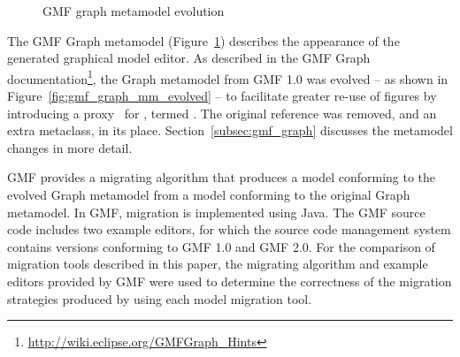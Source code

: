 \begin{figure}[htbp]
	\centering
	\caption{GMF graph metamodel evolution}
\label{fig:gmf_graph_mms}
\end{figure}

The GMF Graph metamodel (Figure~\ref{fig:gmf_graph_mms}) describes the appearance of the generated graphical model editor. As described in the GMF Graph documentation\footnote{\url{http://wiki.eclipse.org/GMFGraph_Hints}}, the Graph metamodel from GMF 1.0 was evolved -- as shown in Figure~\ref{fig:gmf_graph_mm_evolved} -- to facilitate greater re-use of figures by introducing a proxy~\cite{gamma95patterns} for , termed . The original  reference was removed, and an extra metaclass,  in its place. Section~\ref{subsec:gmf_graph} discusses the metamodel changes in more detail.

GMF provides a migrating algorithm that produces a model conforming to the evolved Graph metamodel from a model conforming to the original Graph metamodel. In GMF, migration is implemented using Java. The GMF source code includes two example editors, for which the source code management system contains versions conforming to GMF 1.0 and GMF 2.0. For the comparison of migration tools described in this paper, the migrating algorithm and example editors provided by GMF were used to determine the correctness of the migration strategies produced by using each model migration tool.

